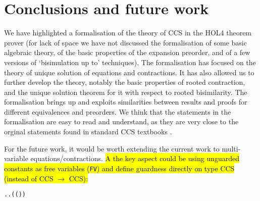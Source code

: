 


\section{Conclusions and future work}
\label{s:concl}

We have highlighted a formalisation of the theory of CCS in the 
HOL4 theorem prover (for lack of space we have not discussed 
the formalisation of some basic algebraic theory, of the basic
properties of the expansion preorder,   and of a few
 versions of `bisimulation up to'
techniques). %
The formalisation has focused on the theory of
unique solution of equations and contractions. 
It has also allowed us to further develop the theory,
notably the basic properties of rooted contraction, and the unique
solution theorem for it with respect to rooted bisimilarity. 
The formalisation brings up and exploits similarities between results
and proofs for different equivalences and preorders. 
We think that the statements in the formalisation are easy to read and
understand, as they are very close to the orginal statements found in
standard CCS textbooks \cite{Gorrieri:2015jt,Mil89}.

For the future work, it would be worth extending the current work
to multi-variable equations/contractions. \hl{
A the key aspect could be using unguarded constants as free variables
(\texttt{FV}) and define guardness directly on type CCS (instead of CCS
$\rightarrow$ CCS):}
\begin{alltt}
\HOLTokenTurnstile{}   \HOLSymConst{\HOLTokenEquiv{}}
   \HOLSymConst{\HOLTokenForall{}}.  \HOLSymConst{\HOLTokenIn{}}   \HOLSymConst{\HOLTokenImp{}} \HOLSymConst{\HOLTokenForall{}}.   \HOLSymConst{\HOLTokenConj{}} ( ( ) \HOLSymConst{=} ) \HOLSymConst{\HOLTokenImp{}}  
\end{alltt}

